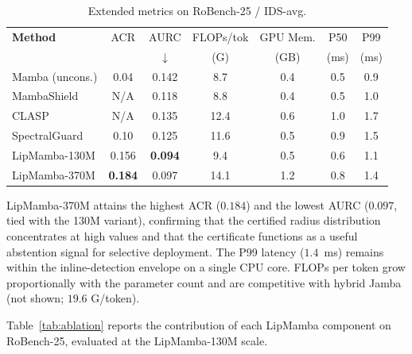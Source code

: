 \documentclass[12pt,a4paper]{article}
\theoremstyle{definition}
\theoremstyle{remark}
\newcommand{\modelname}{LipMamba}
\begin{document}
\begin{table}[!t]
\centering
\caption{Extended metrics on RoBench-25 / IDS-avg.}
\label{tab:extended}
\small
\begin{tabular}{@{}lcccccc@{}}
\toprule
\textbf{Method} & ACR & AURC & FLOPs/tok & GPU Mem. & P50 & P99 \\
& & $\downarrow$ & (G) & (GB) & (ms) & (ms) \\
\midrule
Mamba (uncons.) & 0.04 & 0.142 & 8.7 & 0.4 & 0.5 & 0.9 \\
MambaShield~\cite{anaedevha2025mambashield} & N/A & 0.118 & 8.8 & 0.4 & 0.5 & 1.0 \\
CLASP~\cite{lemercier2026clasp} & N/A & 0.135 & 12.4 & 0.6 & 1.0 & 1.7 \\
SpectralGuard~\cite{lemercier2026spectralguard} & 0.10 & 0.125 & 11.6 & 0.5 & 0.9 & 1.5 \\
\midrule
\modelname{}-130M & 0.156 & \textbf{0.094} & 9.4 & 0.5 & 0.6 & 1.1 \\
\modelname{}-370M & \textbf{0.184} & 0.097 & 14.1 & 1.2 & 0.8 & 1.4 \\
\bottomrule
\end{tabular}
\end{table}

\modelname{}-370M attains the highest ACR ($0.184$) and the lowest AURC ($0.097$, tied with the 130M variant), confirming that the certified radius distribution concentrates at high values and that the certificate functions as a useful abstention signal for selective deployment. The P99 latency ($1.4$~ms) remains within the inline-detection envelope on a single CPU core. FLOPs per token grow proportionally with the parameter count and are competitive with hybrid Jamba (not shown; $19.6$ G/token).




Table~\ref{tab:ablation} reports the contribution of each \modelname{} component on RoBench-25, evaluated at the LipMamba-130M scale.
\end{document}
